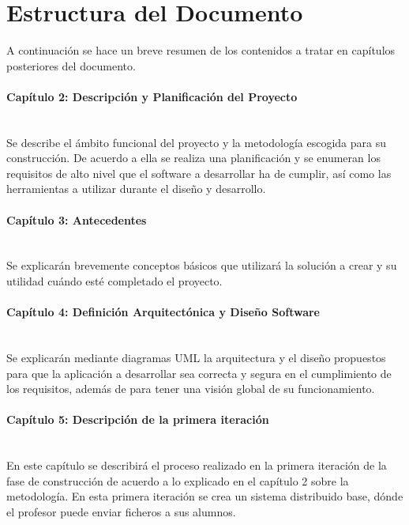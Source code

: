 \section{Estructura del Documento}
\label{sec:intr:organization}

A continuación se hace un breve resumen de los contenidos a tratar en capítulos posteriores del documento.

\paragraph{Capítulo 2: Descripción y Planificación del Proyecto} \ \\

Se describe el ámbito funcional del proyecto y la metodología escogida para su construcción. De acuerdo a ella se realiza una planificación y se enumeran los requisitos de alto nivel que el software a desarrollar ha de cumplir, así como las herramientas a utilizar durante el diseño y desarrollo.


\paragraph{Capítulo 3: Antecedentes} \ \\


Se explicarán brevemente conceptos básicos que utilizará la solución a crear y su utilidad cuándo esté completado el proyecto.


\paragraph{Capítulo 4: Definición Arquitectónica y Diseño Software} \ \\


Se explicarán mediante diagramas UML la arquitectura y el diseño propuestos para que la aplicación a desarrollar  sea correcta y segura en el cumplimiento de los requisitos, además de para tener una visión global de su funcionamiento.


\paragraph{Capítulo 5: Descripción de la primera iteración} \ \\


En este capítulo se describirá el proceso realizado en la primera iteración de la fase de construcción de acuerdo a lo explicado en el capítulo 2 sobre la metodología. En esta primera iteración se crea un sistema distribuido base, dónde el profesor puede enviar ficheros a sus alumnos.


